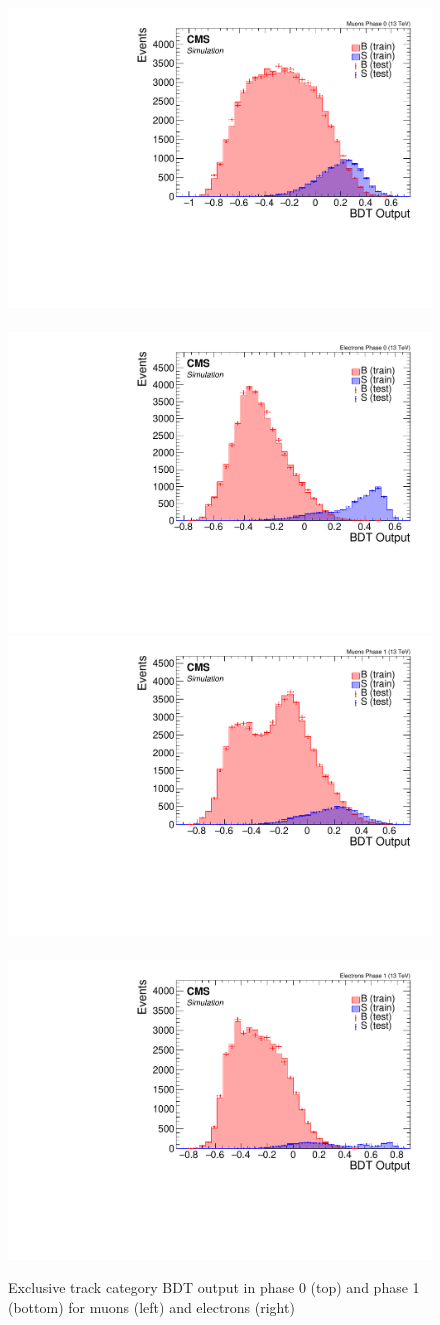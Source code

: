 \begin{figure}[!htb]
\centering
\includegraphics[width=0.48\linewidth]{plots/extrack_bdt/overtraining_Event_Ex_Track_Muons_Phase_0.pdf} \,
\includegraphics[width=0.48\linewidth]{plots/extrack_bdt/overtraining_Event_Ex_Track_Electrons_Phase_0.pdf} \\

\includegraphics[width=0.48\linewidth]{plots/extrack_bdt/overtraining_Event_Ex_Track_Muons_Phase_1.pdf} \,
\includegraphics[width=0.48\linewidth]{plots/extrack_bdt/overtraining_Event_Ex_Track_Electrons_Phase_1.pdf} \\

\caption[Exclusive track category BDT outputs]{Exclusive track category BDT output in phase 0 (top) and phase 1 (bottom) for muons (left) and electrons (right)}
\label{fig:event-bdt-ex-track-output}
\end{figure}

